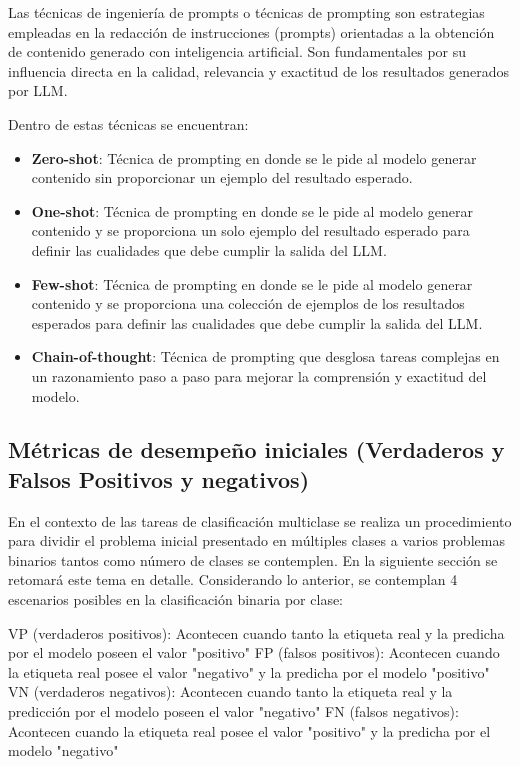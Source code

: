 Las técnicas de ingeniería de prompts o técnicas de prompting son estrategias empleadas en la redacción de instrucciones (prompts) orientadas a la obtención de contenido generado con inteligencia artificial. Son fundamentales por su influencia directa en la calidad, relevancia y exactitud de los resultados generados por LLM. \cite{PromptEngByIBM}

Dentro de estas técnicas se encuentran:

\begin{itemize}
    \item \textbf{Zero-shot}: Técnica de prompting en donde se le pide al modelo generar contenido sin proporcionar un ejemplo del resultado esperado.
    \item \textbf{One-shot}: Técnica de prompting en donde se le pide al modelo generar contenido y se proporciona un solo ejemplo del resultado esperado para definir las cualidades que debe cumplir la salida del LLM.
    \item \textbf{Few-shot}: Técnica de prompting en donde se le pide al modelo generar contenido y se proporciona una colección de ejemplos de los resultados esperados para definir las cualidades que debe cumplir la salida del LLM.
    \item \textbf{Chain-of-thought}: Técnica de prompting que desglosa tareas complejas en un razonamiento paso a paso para mejorar la comprensión y exactitud del modelo.
\end{itemize}

\cite{PromptEngByIBM}

\subsection{Métricas de desempeño iniciales (Verdaderos y Falsos Positivos y negativos)}

En el contexto de las tareas de clasificación multiclase se realiza un procedimiento para dividir el problema inicial presentado en múltiples clases a varios problemas binarios tantos como número de clases se contemplen. En la siguiente sección se retomará este tema en detalle. Considerando lo anterior, se contemplan 4 escenarios posibles en la clasificación binaria por clase:

VP (verdaderos positivos): Acontecen cuando tanto la etiqueta real y la predicha por el modelo poseen el valor "positivo"
FP (falsos positivos): Acontecen cuando la etiqueta real posee el valor "negativo" y la predicha por el modelo "positivo"
VN (verdaderos negativos): Acontecen cuando tanto la etiqueta real y la predicción por el modelo poseen el valor "negativo" 
FN (falsos negativos): Acontecen cuando la etiqueta real posee el valor "positivo" y la predicha por el modelo "negativo"

